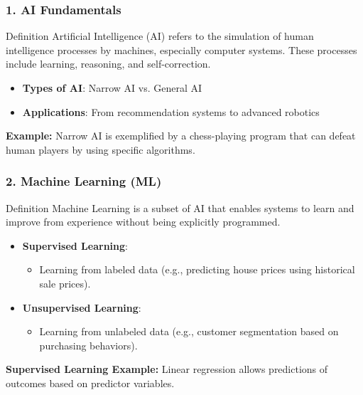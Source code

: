 \documentclass[aspectratio=169]{beamer}
\begin{document}
\begin{frame}[fragile]
    \frametitle{1. AI Fundamentals}
    \begin{block}{Definition}
        Artificial Intelligence (AI) refers to the simulation of human intelligence processes by machines, especially computer systems.
        These processes include learning, reasoning, and self-correction.
    \end{block}
    
    \begin{itemize}
        \item \textbf{Types of AI}: Narrow AI vs. General AI
        \item \textbf{Applications}: From recommendation systems to advanced robotics
    \end{itemize}

    \begin{example}    
        \textbf{Example:} Narrow AI is exemplified by a chess-playing program that can defeat human players by using specific algorithms.
    \end{example}
\end{frame}

\begin{frame}[fragile]
    \frametitle{2. Machine Learning (ML)}
    \begin{block}{Definition}
        Machine Learning is a subset of AI that enables systems to learn 
        and improve from experience without being explicitly programmed.
    \end{block}
    
    \begin{itemize}
        \item \textbf{Supervised Learning}:
            \begin{itemize}
                \item Learning from labeled data (e.g., predicting house prices using historical sale prices).
            \end{itemize}
        \item \textbf{Unsupervised Learning}:
            \begin{itemize}
                \item Learning from unlabeled data (e.g., customer segmentation based on purchasing behaviors).
            \end{itemize}
    \end{itemize}

    \begin{example}
        \textbf{Supervised Learning Example:} Linear regression allows predictions of outcomes based on predictor variables.
    \end{example}
\end{frame}
\end{document}
